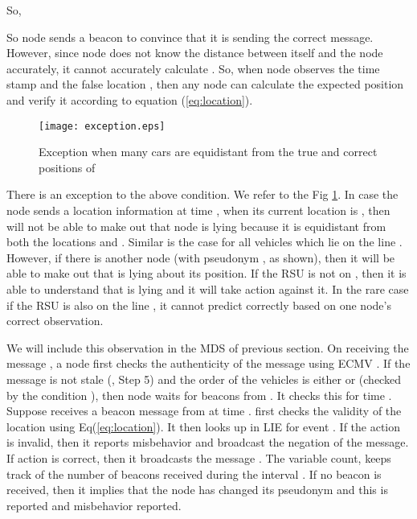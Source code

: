 \documentclass[conference]{IEEEtran}[10pt]
\begin{document}
So, 

So node  sends a beacon  to convince  that it is sending the correct message. 
However, since node  does not know the distance  between itself and the node  accurately,   
it cannot accurately calculate . 
So, when node  observes the time stamp  and the false location , then any node can 
calculate the expected position and verify it according to equation (\ref{eq:location}). 


\begin{figure}[htb]
\begin{centering}
\texttt{[image: exception.eps]}
\caption{
Exception when many cars are equidistant from the true and correct positions of 
}
\label{fig:exception}
\end{centering}
\end{figure}

There is an exception to the above condition. 
We refer to the Fig \ref{fig:exception}. 
In case the node sends a location information  at time , when its current location is , 
then  will not be able to make out that node  is lying because it is equidistant from both
the locations  and . 
Similar is the case for all vehicles which lie on the line . 
However, if there is another node  (with pseudonym , as shown),  then it will be able to make out that  is lying about its position. 
If the RSU is not on , then it is able to understand that  is lying and  it will take action against it. 
In the rare case if the RSU is also on the line , it cannot predict correctly based on one node's correct observation. 





We will include this observation in the MDS of previous section. 
On receiving the message , a node  first checks the authenticity of the message using ECMV \cite{WJS08}. 
If the message is not stale (, Step 5) and the order of the vehicles is either  or  (checked by the condition 
), then node  waits for beacons  from . 
It checks this for time . 
Suppose   receives a beacon message  from  at time . 
 first checks the validity of the location using Eq(\ref{eq:location}). 
It then looks up in LIE for event . 
If the action is invalid, then it reports misbehavior and broadcast the negation of the message. 
If action is correct, then it broadcasts the message . 
The variable count, keeps track of the number of beacons received during the interval . 
If no beacon is received, then it implies that the node  has changed its pseudonym and this is reported and misbehavior reported. 
\end{document}
